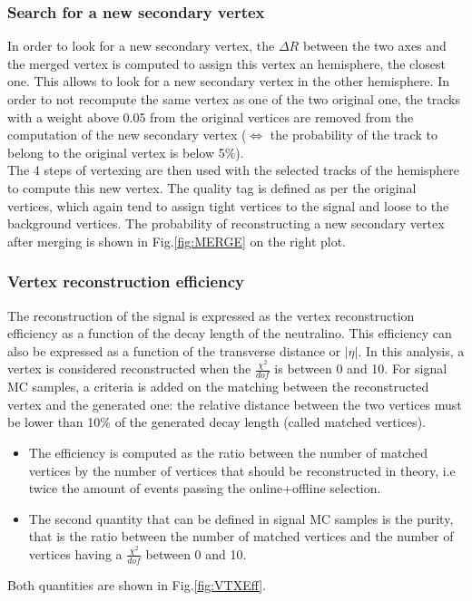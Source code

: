 \documentclass{cernatlasnote}
\begin{document}
        
        \subsubsection{Search for a new secondary vertex}
            In order to look for a new secondary vertex, the $\Delta R$ between the two axes and the merged vertex is computed to assign this vertex an hemisphere, the closest one. This allows to look for a new secondary vertex in the other hemisphere. In order to not recompute the same vertex as one of the two original one, the tracks with a weight above 0.05 from the original vertices are removed from the computation of the new secondary vertex ($\Leftrightarrow$ the probability of the track to belong to the original vertex is below 5\%). \\
            The 4 steps of vertexing are then used with the selected tracks of the hemisphere to compute this new vertex. The quality tag is defined as per the original vertices, which again tend to assign tight vertices to the signal and loose to the background vertices. The probability of reconstructing a new secondary vertex after merging is shown in Fig.\ref{fig:MERGE} on the right plot.

    
        
        \subsubsection{Vertex reconstruction efficiency}

                The reconstruction of the signal is expressed as the vertex reconstruction efficiency as a function of the decay length of the neutralino. This efficiency can also be expressed as a function of the transverse distance  or $|\eta|$.
                In this analysis, a vertex is considered reconstructed when the $\frac{\chi^2}{dof}$ is between 0 and 10.  For signal MC samples, a criteria is added on the matching between the reconstructed vertex and the generated one: the relative distance between the two vertices must be lower than 10\% of the generated decay length (called matched vertices). 
                \begin{itemize}
                    \item The efficiency is computed as the ratio between the number of matched vertices by the number of vertices that should be reconstructed in theory, i.e twice the amount of events passing the online+offline selection.
                    \item The second quantity that can be defined in signal MC samples is the purity, that is the ratio between the number of matched vertices and the number of vertices having a $\frac{\chi^2}{dof}$ between 0 and 10.
                \end{itemize}
            Both quantities are shown in Fig.\ref{fig:VTXEff}.  
\end{document}
